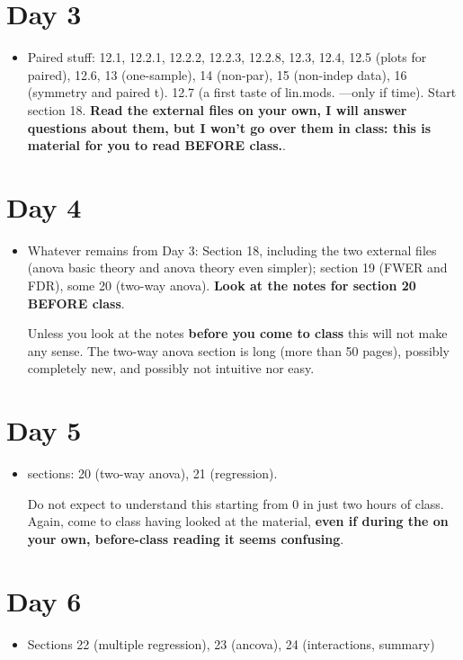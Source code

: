 \documentclass[12pt]{article}
\begin{document}
\section*{Day 3}
\label{sec:org609aabb}
\begin{itemize}
\item Paired stuff: 12.1, 12.2.1, 12.2.2, 12.2.3, 12.2.8, 12.3, 12.4, 12.5 (plots for paired), 12.6, 13 (one-sample), 14 (non-par), 15 (non-indep data), 16 (symmetry and paired t). 12.7 (a first taste of lin.mods. ---only if time). Start section 18. \textbf{Read the external files on your own, I will answer questions about them, but I won't go over them in class: this is material for you to read BEFORE class.}.
\end{itemize}
\section*{Day 4 }
\label{sec:org394fbf9}
\begin{itemize}
\item Whatever remains from Day 3: Section 18, including the two external files (anova basic theory and anova theory even simpler); section 19 (FWER and FDR), some 20 (two-way anova). \textbf{Look at the notes for section 20 BEFORE class}.

   Unless you look at the notes \textbf{before you come to class} this will not make any sense. The two-way anova section is long (more than 50 pages), possibly completely new, and possibly not intuitive nor easy.

\end{itemize}
\section*{Day 5 }
\label{sec:orgcb0a12f}
\begin{itemize}
\item sections: 20 (two-way anova), 21 (regression).


  Do not expect to understand this starting from 0 in just two hours of class. Again, come to class having looked at the material, \textbf{even if during the on your own, before-class reading it seems confusing}.
\end{itemize}
\section*{Day 6 }
\label{sec:org6f322e8}
\begin{itemize}
\item Sections 22 (multiple regression), 23 (ancova), 24 (interactions, summary)
\end{itemize}
\end{document}
